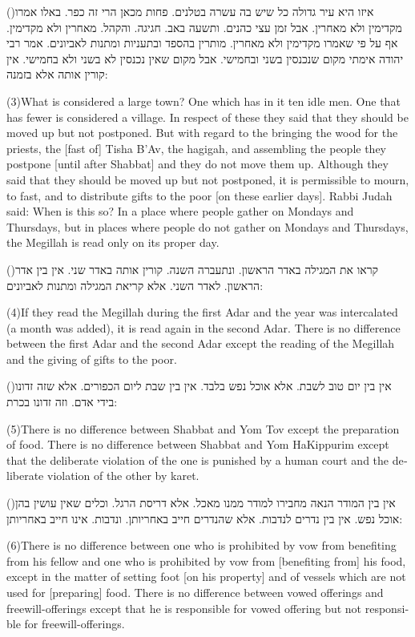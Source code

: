 \documentclass[12pt, openany]{book}
\newcommand{\sethebfont}{
\fontsize{10.5pt}{13.1pt} \selectfont
}
\newcommand{\hebeng}[2]{
	{\sethebfont #1\\}
	
	\begin{english}
		#2
	\end{english}
	\clearpage
}
\newcommand{\vsnum}[1]{(\hebrewnumeral{#1})\space}
\newcommand{\vsnumeng}[1]{(#1)\space}
\begin{document}
\hebeng{\vsnum{3}איזו היא עיר גדולה כל שיש בה עשרה בטלנים. פחות מכאן הרי זה כפר. באלו אמרו מקדימין ולא מאחרין. אבל זמן עצי כהנים. ותשעה באב. חגיגה. והקהל. מאחרין ולא מקדימין. אף על פי שאמרו מקדימין ולא מאחרין. מותרין בהספד ובתעניות ומתנות לאביונים. אמר רבי יהודה אימתי מקום שנכנסין בשני ובחמישי. אבל מקום שאין נכנסין לא בשני ולא בחמישי. אין קורין אותה אלא בזמנה: 
}{\vsnumeng{3}What is considered a large town? One which has in it ten idle men. One that has fewer is considered a village. In respect of these they said that they should be moved up but not postponed. But with regard to the bringing the wood for the priests, the {[fast of]} Tisha B’Av, the hagigah, and assembling the people they postpone {[until after Shabbat]} and they do not move them up. Although they said that they should be moved up but not postponed, it is permissible to mourn, to fast, and to distribute gifts to the poor {[on these earlier days]}. Rabbi Judah said: When is this so? In a place where people gather on Mondays and Thursdays, but in places where people do not gather on Mondays and Thursdays, the Megillah is read only on its proper day.}%

\hebeng{\vsnum{4}קראו את המגילה באדר הראשון. ונתעברה השנה. קורין אותה באדר שני. אין בין אדר הראשון. לאדר השני. אלא קריאת המגילה ומתנות לאביונים: 
}{\vsnumeng{4}If they read the Megillah during the first Adar and the year was intercalated (a month was added), it is read again in the second Adar. There is no difference between the first Adar and the second Adar except the reading of the Megillah and the giving of gifts to the poor.}%

\hebeng{\vsnum{5}אין בין יום טוב לשבת. אלא אוכל נפש בלבד. אין בין שבת ליום הכפורים. אלא שזה זדונו בידי אדם. וזה זדונו בכרת: 
}{\vsnumeng{5}There is no difference between Shabbat and Yom Tov except the preparation of food. There is no difference between Shabbat and Yom HaKippurim except that the deliberate violation of the one is punished by a human court and the deliberate violation of the other by karet.}%

\hebeng{\vsnum{6}אין בין המודר הנאה מחבירו למודר ממנו מאכל. אלא דריסת הרגל. וכלים שאין עושין בהן אוכל נפש. אין בין נדרים לנדבות. אלא שהנדרים חייב באחריותן. ונדבות. אינו חייב באחריותן: 
}{\vsnumeng{6}There is no difference between one who is prohibited by vow from benefiting from his fellow and one who is prohibited by vow from {[benefiting from]} his food, except in the matter of setting foot {[on his property]} and of vessels which are not used for {[preparing]} food. There is no difference between vowed offerings and freewill-offerings except that he is responsible for vowed offering but not responsible for freewill-offerings.}%
\end{document}
